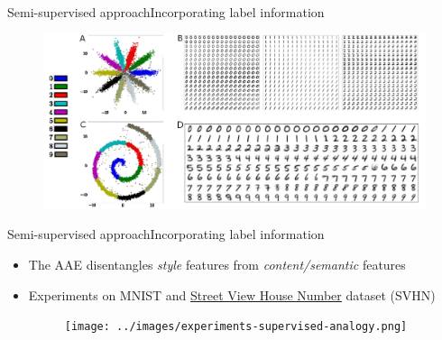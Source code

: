 \documentclass[10pt]{beamer}
\begin{document}
\begin{frame}{Semi-supervised approach}{Incorporating label information}
\begin{figure}
  \centering
  \includegraphics[width=\linewidth]{../images/dim_reduction-scatter-02.png}
\end{figure}
\end{frame}

\begin{frame}{Semi-supervised approach}{Incorporating label information}
\begin{itemize}
  \item The AAE disentangles \textit{style} features from \textit{content/semantic} features
  \item Experiments on MNIST and \href{../images/svhn.gif}{\underline{Street View House Number}} dataset (SVHN)
  \begin{figure}
    \centering
    \texttt{[image: ../images/experiments-supervised-analogy.png]}
  \end{figure}
\end{itemize}
\end{frame}
\end{document}
